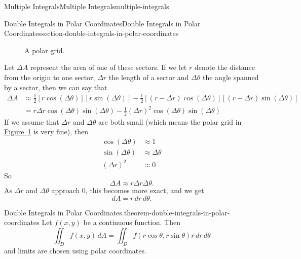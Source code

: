 \documentclass[oneside,10pt,]{book}
\numberwithin{equation}{section}
\begin{document}
\begin{chapterptx}{Multiple Integrals}{}{Multiple Integrals}{}{}{multiple-integrals}
\begin{sectionptx}{Double Integrals in Polar Coordinates}{}{Double Integrals in Polar Coordinates}{}{}{section-double-integrals-in-polar-coordinates}
\begin{figure}
{
}
\caption{A polar grid.\label{figure-polar-rectangle}}
\end{figure}
%
\par
\hypertarget{p-1490}{}%
Let \(\Delta A\) represent the area of one of these sectors. If we let \(r\) denote the distance from the origin to one sector, \(\Delta r\) the length of a sector and \(\Delta\theta\) the angle spanned by a sector, then we can say that%
\begin{align*}
\Delta A & \approx \frac{1}{2}[r\cos(\Delta\theta)][r\sin(\Delta\theta)] - \frac{1}{2}[(r-\Delta r)\cos(\Delta\theta)][(r-\Delta r)\sin(\Delta\theta)] \\
& = r\Delta r\cos(\Delta\theta)\sin(\Delta\theta) - \frac{1}{2}(\Delta r)^{2}\cos(\Delta\theta)\sin(\Delta\theta)
\end{align*}
If we assume that \(\Delta r\) and \(\Delta\theta\) are both small (which means the polar grid in \hyperref[figure-polar-rectangle]{Figure~\ref{figure-polar-rectangle}} is very fine), then%
\begin{align*}
\cos(\Delta\theta) & \approx 1 \\
\sin(\Delta\theta) & \approx \Delta\theta \\
(\Delta r)^{2} & \approx 0 
\end{align*}
So%
\begin{equation*}
\Delta A \approx r\Delta r\Delta\theta\text{.}
\end{equation*}
As \(\Delta r\) and \(\Delta\theta\) approach \(0\), this becomes more exact, and we get%
\begin{equation*}
dA = r\,dr\,d\theta\text{.}
\end{equation*}
%
\begin{theorem}{Double Integrals in Polar Coordinates.}{}{theorem-double-integrals-in-polar-coordinates}%
\hypertarget{p-1491}{}%
Let \(f(x,y)\) be a continuous function. Then%
\begin{equation*}
\iint_{D}f(x,y)\,dA = \iint_{D}f(r\cos\theta,r\sin\theta)r\,dr\,d\theta
\end{equation*}
and limits are chosen using polar coordinates.%
\end{theorem}

\end{sectionptx}
\end{chapterptx}
\end{document}
